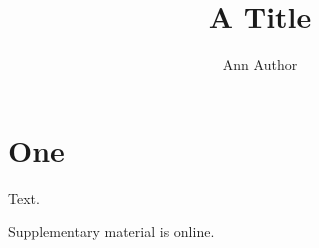 \documentclass{sagej}
\begin{document}
\title{A Title}
\author{Ann Author}
\maketitle
\section{One}
Text.
\begin{sm}Supplementary material is online.\end{sm}
\end{document}
